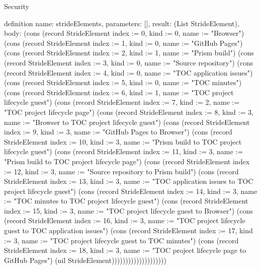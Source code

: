 \begin{lexlean}{Security}
\begin{semanticmodule}
definition{
  name: strideElements,
  parameters: [],
  result: (List StrideElement),
  body: (cons (record StrideElement {index := 0, kind := 0, name := "Browser"}) (cons (record StrideElement {index := 1, kind := 0, name := "GitHub Pages"}) (cons (record StrideElement {index := 2, kind := 1, name := "Prism build"}) (cons (record StrideElement {index := 3, kind := 0, name := "Source repository"}) (cons (record StrideElement {index := 4, kind := 0, name := "TOC application issues"}) (cons (record StrideElement {index := 5, kind := 0, name := "TOC minutes"}) (cons (record StrideElement {index := 6, kind := 1, name := "TOC project lifecycle guest"}) (cons (record StrideElement {index := 7, kind := 2, name := "TOC project lifecycle page"}) (cons (record StrideElement {index := 8, kind := 3, name := "Browser to TOC project lifecycle guest"}) (cons (record StrideElement {index := 9, kind := 3, name := "GitHub Pages to Browser"}) (cons (record StrideElement {index := 10, kind := 3, name := "Prism build to TOC project lifecycle guest"}) (cons (record StrideElement {index := 11, kind := 3, name := "Prism build to TOC project lifecycle page"}) (cons (record StrideElement {index := 12, kind := 3, name := "Source repository to Prism build"}) (cons (record StrideElement {index := 13, kind := 3, name := "TOC application issues to TOC project lifecycle guest"}) (cons (record StrideElement {index := 14, kind := 3, name := "TOC minutes to TOC project lifecycle guest"}) (cons (record StrideElement {index := 15, kind := 3, name := "TOC project lifecycle guest to Browser"}) (cons (record StrideElement {index := 16, kind := 3, name := "TOC project lifecycle guest to TOC application issues"}) (cons (record StrideElement {index := 17, kind := 3, name := "TOC project lifecycle guest to TOC minutes"}) (cons (record StrideElement {index := 18, kind := 3, name := "TOC project lifecycle page to GitHub Pages"}) (nil StrideElement))))))))))))))))))))
}


\end{semanticmodule}
\end{lexlean}
